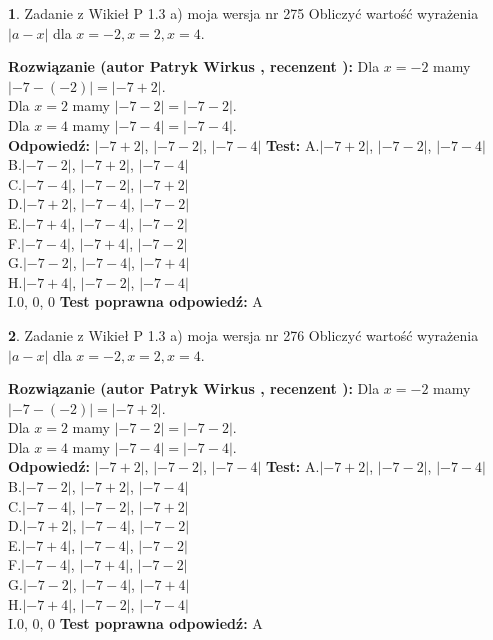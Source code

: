 \documentclass[12pt, a4paper]{article}
\theoremstyle{definition} %
\newtheorem{zad}{}
\newcommand{\zadStart}[1]{\begin{zad}#1\newline}
\newcommand{\zadStop}{\end{zad}}
\newcommand{\rozwStart}[2]{\noindent \textbf{Rozwiązanie (autor #1 , recenzent #2): }\newline}
\newcommand{\rozwStop}{\newline}
\newcommand{\odpStart}{\noindent \textbf{Odpowiedź:}\newline}
\newcommand{\odpStop}{\newline}
\newcommand{\testStart}{\noindent \textbf{Test:}\newline}
\newcommand{\testStop}{\newline}
\newcommand{\kluczStart}{\noindent \textbf{Test poprawna odpowiedź:}\newline}
\newcommand{\kluczStop}{\newline}
\begin{document}
\zadStart{Zadanie z Wikieł P 1.3 a) moja wersja nr 275}
Obliczyć wartość wyrażenia $|a - x|$ dla $x=-2,x=2,x=4$.
\zadStop
\rozwStart{Patryk Wirkus}{}
Dla $x = -2$ mamy $|-7 - (-2)| = |-7 + 2|$.\\
Dla $x = 2$ mamy $|-7 - 2| = |-7 - 2|$.\\
Dla $x = 4$ mamy $|-7 - 4| = |-7 - 4|$.\\
\rozwStop
\odpStart
$|-7 + 2|$, $|-7 - 2|$, $|-7 - 4|$
\odpStop
\testStart
A.$|-7 + 2|$, $|-7 - 2|$, $|-7 - 4|$\\
B.$|-7 - 2|$, $|-7 + 2|$, $|-7 - 4|$\\
C.$|-7 - 4|$, $|-7 - 2|$, $|-7 + 2|$\\
D.$|-7 + 2|$, $|-7 - 4|$, $|-7 - 2|$\\
E.$|-7 + 4|$, $|-7 - 4|$, $|-7 - 2|$\\
F.$|-7 - 4|$, $|-7 + 4|$, $|-7 - 2|$\\
G.$|-7 - 2|$, $|-7 - 4|$, $|-7 + 4|$\\
H.$|-7 + 4|$, $|-7 - 2|$, $|-7 - 4|$\\
I.$0$, $0$, $0$
\testStop
\kluczStart
A
\kluczStop



\zadStart{Zadanie z Wikieł P 1.3 a) moja wersja nr 276}
Obliczyć wartość wyrażenia $|a - x|$ dla $x=-2,x=2,x=4$.
\zadStop
\rozwStart{Patryk Wirkus}{}
Dla $x = -2$ mamy $|-7 - (-2)| = |-7 + 2|$.\\
Dla $x = 2$ mamy $|-7 - 2| = |-7 - 2|$.\\
Dla $x = 4$ mamy $|-7 - 4| = |-7 - 4|$.\\
\rozwStop
\odpStart
$|-7 + 2|$, $|-7 - 2|$, $|-7 - 4|$
\odpStop
\testStart
A.$|-7 + 2|$, $|-7 - 2|$, $|-7 - 4|$\\
B.$|-7 - 2|$, $|-7 + 2|$, $|-7 - 4|$\\
C.$|-7 - 4|$, $|-7 - 2|$, $|-7 + 2|$\\
D.$|-7 + 2|$, $|-7 - 4|$, $|-7 - 2|$\\
E.$|-7 + 4|$, $|-7 - 4|$, $|-7 - 2|$\\
F.$|-7 - 4|$, $|-7 + 4|$, $|-7 - 2|$\\
G.$|-7 - 2|$, $|-7 - 4|$, $|-7 + 4|$\\
H.$|-7 + 4|$, $|-7 - 2|$, $|-7 - 4|$\\
I.$0$, $0$, $0$
\testStop
\kluczStart
A
\kluczStop
\end{document}
